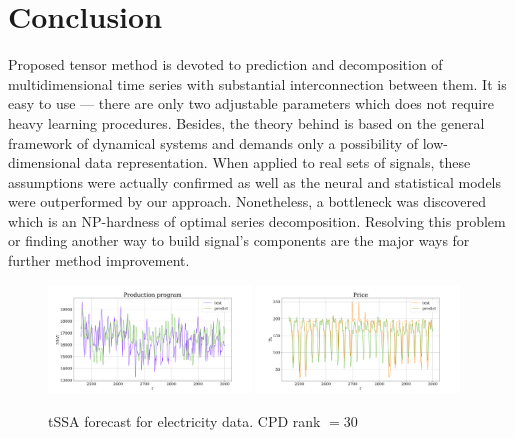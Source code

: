 	\section{Conclusion}
	
		Proposed tensor method is devoted to prediction and decomposition of multidimensional time series with substantial interconnection between them. It is easy to use --- there are only two adjustable parameters which does not require heavy learning procedures. Besides, the theory behind is based on the general framework of dynamical systems and demands only a possibility of low-dimensional data representation. When applied to real sets of signals, these assumptions were actually confirmed as well as the neural and statistical models were outperformed by our approach. Nonetheless, a bottleneck was discovered which is an NP-hardness of optimal series decomposition. Resolving this problem or finding another way to build signal's components are the major ways for further method improvement.
		
		\begin{figure}[h]
			\centering
			\includegraphics[width=0.48\textwidth, keepaspectratio]{../../experiments/electricity/tssa/figs/prediction/cpd_rank_30/Production_program.png}
			\includegraphics[width=0.48\textwidth, keepaspectratio]{../../experiments/electricity/tssa/figs/prediction/cpd_rank_30/Price.png}
			\caption{tSSA forecast for electricity data. CPD rank $ = 30 $}\label{fig:tssa_electr_pred}
		\end{figure}
		
